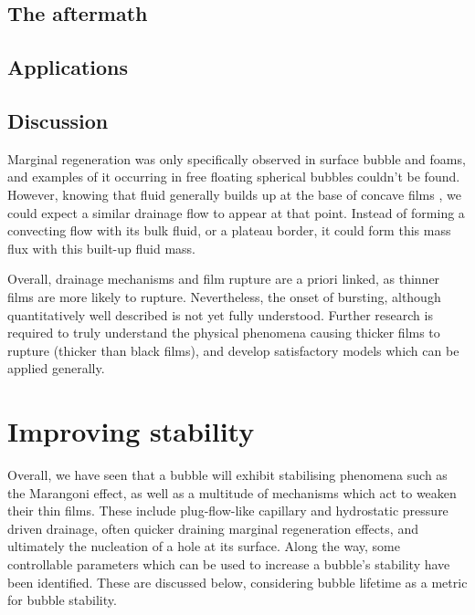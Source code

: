 \documentclass[a4paper,12pt]{article}
\numberwithin{equation}{section}
\numberwithin{figure}{section}
\numberwithin{table}{section}
\begin{document}
\subsection{The aftermath}

\subsection{Applications}

\subsection{Discussion}

Marginal regeneration was only specifically observed in surface bubble and foams, and examples of it occurring in free floating spherical bubbles couldn't be found. However, knowing that fluid generally builds up at the base of concave films \cite{Shen2020}, we could expect a similar drainage flow to appear at that point. Instead of forming a convecting flow with its bulk fluid, or a plateau border, it could form this mass flux with this built-up fluid mass.

Overall, drainage mechanisms and film rupture are a priori linked, as thinner films are more likely to rupture. Nevertheless, the onset of bursting, although quantitatively well described is not yet fully understood. Further research is required to truly understand the physical phenomena causing thicker films to rupture (thicker than black films), and develop satisfactory models which can be applied generally.


\section{Improving stability}
Overall, we have seen that a bubble will exhibit stabilising phenomena such as the Marangoni effect, as well as a multitude of mechanisms which act to weaken their thin films. These include plug-flow-like capillary and hydrostatic pressure driven drainage, often quicker draining marginal regeneration effects, and ultimately the nucleation of a hole at its surface. Along the way, some controllable parameters which can be used to increase a bubble's stability have been identified. These are discussed below, considering bubble lifetime as a metric for bubble stability.
\end{document}
